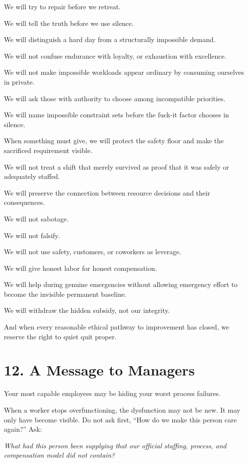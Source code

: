 \documentclass[11pt,oneside]{article}
\renewenvironment{quote}
  {\begin{tcolorbox}[
      enhanced,
      breakable,
      colback=ManifestLight,
      colframe=ManifestRule,
      boxrule=0pt,
      leftrule=3pt,
      arc=0pt,
      outer arc=0pt,
      left=10pt,right=10pt,top=8pt,bottom=8pt,
      before skip=0.8em,after skip=0.8em
    ]\itshape}
  {\end{tcolorbox}}
\begin{document}
We will try to repair before we retreat.

We will tell the truth before we use silence.

We will distinguish a hard day from a structurally impossible demand.

We will not confuse endurance with loyalty, or exhaustion with
excellence.

We will not make impossible workloads appear ordinary by consuming
ourselves in private.

We will ask those with authority to choose among incompatible
priorities.

We will name impossible constraint sets before the fuck-it factor
chooses in silence.

When something must give, we will protect the safety floor and make the
sacrificed requirement visible.

We will not treat a shift that merely survived as proof that it was
safely or adequately staffed.

We will preserve the connection between resource decisions and their
consequences.

We will not sabotage.

We will not falsify.

We will not use safety, customers, or coworkers as leverage.

We will give honest labor for honest compensation.

We will help during genuine emergencies without allowing emergency
effort to become the invisible permanent baseline.

We will withdraw the hidden subsidy, not our integrity.

And when every reasonable ethical pathway to improvement has closed, we
reserve the right to quiet quit proper.

\section{12. A Message to Managers}\label{a-message-to-managers}

Your most capable employees may be hiding your worst process failures.

When a worker stops overfunctioning, the dysfunction may not be new. It
may only have become visible. Do not ask first, ``How do we make this
person care again?'' Ask:

\begin{quote}
What had this person been supplying that our official staffing, process,
and compensation model did not contain?
\end{quote}
\end{document}
